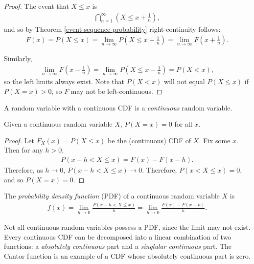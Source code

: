 \begin{proof}
    The event that $X \leq x$ is
    \begin{align*}
        \bigcap_{n = 1}^{\infty}(X \leq x + \frac{1}{n}),
    \end{align*}
    and so by Theorem \ref{event-sequence-probability} right-continuity follows:
    \begin{align*}
        F(x) = P(X \leq x) = \lim_{n \to \infty}P(X \leq x + \frac{1}{n}) = \lim_{n \to \infty}F(x + \frac{1}{n}).
    \end{align*}

    Similarly,
    \begin{align*}
        \lim_{n \to \infty}F(x - \frac{1}{n}) = \lim_{n \to \infty}P(X \leq x - \frac{1}{n}) = P(X < x),
    \end{align*}
    so the left limits always exist. Note that $P(X < x)$ will not equal $P(X \leq x)$ if $P(X = x) > 0$, so $F$ may not be left-continuous.
\end{proof}

\begin{defn}
    A random variable with a continuous CDF is a \emph{continuous} random variable.
\end{defn}

\begin{prop}
    Given a continuous random variable $X$, $P(X = x) = 0$ for all $x$.
\end{prop}

\begin{proof}
    Let $F_X(x) = P(X \leq x)$ be the (continuous) CDF of $X$. Fix some $x$. Then for any $h > 0$,
    \begin{align*}
        P(x-h < X \leq x) = F(x) - F(x - h).
    \end{align*}
    Therefore, as $h \to 0$, $P(x - h < X \leq x) \to 0$. Therefore, $P(x < X \leq x) = 0$, and so $P(X = x) = 0$.
\end{proof}

\begin{defn}
    The \emph{probability density function} (PDF) of a continuous random variable $X$ is
    \begin{align*}
        f(x) = \lim_{h \to 0}\frac{P(x - h < X \leq x)}{h} = \lim_{h \to 0}\frac{F(x) - F(x-h)}{h}.
    \end{align*}
\end{defn}

\begin{rmk}
    Not all continuous random variables possess a PDF, since the limit may not exist. Every continuous CDF can be decomposed into a linear combination of two functions: a \emph{absolutely continuous} part and a \emph{singlular continuous} part. The Cantor function is an example of a CDF whose absolutely continuous part is zero.
\end{rmk}

